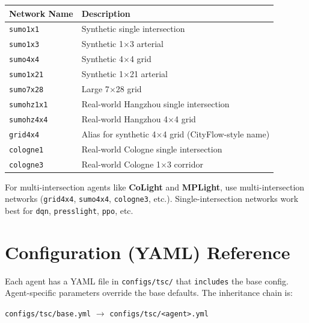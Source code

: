 \documentclass[11pt,a4paper]{article}
\begin{document}
\begin{center}
\begin{longtable}{lp{8cm}}
\toprule
\textbf{Network Name} & \textbf{Description} \\
\midrule
\endhead
\texttt{sumo1x1}          & Synthetic single intersection \\
\texttt{sumo1x3}          & Synthetic 1$\times$3 arterial \\
\texttt{sumo4x4}          & Synthetic 4$\times$4 grid \\
\texttt{sumo1x21}         & Synthetic 1$\times$21 arterial \\
\texttt{sumo7x28}         & Large 7$\times$28 grid \\
\texttt{sumohz1x1}        & Real-world Hangzhou single intersection \\
\texttt{sumohz4x4}        & Real-world Hangzhou 4$\times$4 grid \\
\texttt{grid4x4}          & Alias for synthetic 4$\times$4 grid (CityFlow-style name) \\
\texttt{cologne1}         & Real-world Cologne single intersection \\
\texttt{cologne3}         & Real-world Cologne 1$\times$3 corridor \\
\bottomrule
\end{longtable}
\end{center}

\begin{infobox}
For multi-intersection agents like \textbf{CoLight} and \textbf{MPLight}, use multi-intersection networks
(\texttt{grid4x4}, \texttt{sumo4x4}, \texttt{cologne3}, etc.).
Single-intersection networks work best for \texttt{dqn}, \texttt{presslight}, \texttt{ppo}, etc.
\end{infobox}

\section{Configuration (YAML) Reference}

Each agent has a YAML file in \texttt{configs/tsc/} that \texttt{includes} the base config.
Agent-specific parameters override the base defaults.
The inheritance chain is:

\begin{center}
\texttt{configs/tsc/base.yml} $\longrightarrow$ \texttt{configs/tsc/<agent>.yml}
\end{center}
\end{document}
